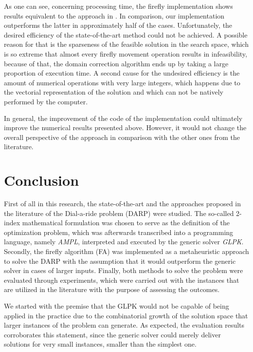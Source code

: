 \documentclass[tuberlin,cic,tc,openright,english,noabntcite,oneside]{iiufrgs}
\begin{document}
As one can see, concerning processing time, the firefly implementation shows results equivalent to the approach in  \textcite{parragh_introducing_2011}. In comparison, our implementation outperforms the latter in approximately half of the cases. Unfortunately, the desired efficiency of the state-of-the-art method could not be achieved. A possible reason for that is the sparseness of the feasible solution in the search space, which is so extreme that almost every firefly movement operation results in infeasibility, because of that, the domain correction algorithm ends up by taking a large proportion of execution time. A second cause for the undesired efficiency is the amount  of numerical operations with very large integers, which happens due to the vectorial representation of the solution and which can not be natively performed by the computer.

In general, the improvement of the code of the implementation could ultimately improve the numerical results presented above. However, it would not change the overall perspective of the approach in comparison with the other ones from the literature.

\chapter{Conclusion}
First of all in this research, the state-of-the-art and the approaches proposed in the literature of the Dial-a-ride problem (DARP) were studied. The so-called 2-index mathematical formulation was chosen to serve as the definition of the optimization problem, which was afterwards transcribed into a programming language, namely \emph{AMPL}, interpreted and executed by the generic solver \emph{GLPK}. Secondly, the firefly algorithm (FA) was implemented as a metaheuristic approach to solve the DARP with the assumption that it would outperform the generic solver in cases of larger inputs. Finally, both methods to solve the problem were evaluated through experiments, which were carried out with the instances that are utilized in the literature with the purpose of assessing the outcomes.

We started with the premise that the GLPK would not be capable of being applied in the practice due to the combinatorial growth of the solution space that larger instances of the problem can generate. As expected, the evaluation results corroborates this statement, since the generic solver could merely deliver solutions for very small instances, smaller than the simplest one.
\end{document}
